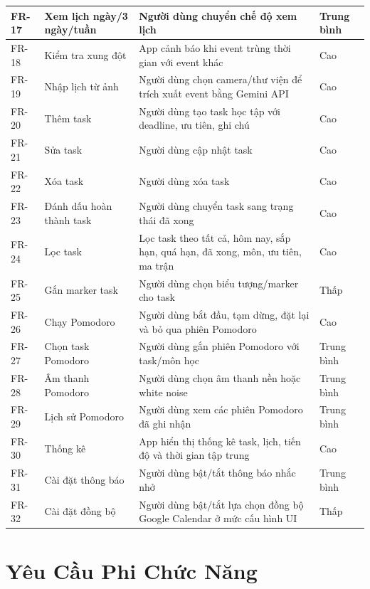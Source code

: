 \documentclass[12pt,a4paper]{report}
\begin{document}
\begin{longtable}{|>{\raggedright\arraybackslash}p{}|>{\raggedright\arraybackslash}p{}|>{\raggedright\arraybackslash}p{}|>{\raggedright\arraybackslash}p{}|}
FR-17 & Xem lịch ngày/3 ngày/tuần & Người dùng chuyển chế độ xem lịch & Trung bình \\ \hline
FR-18 & Kiểm tra xung đột & App cảnh báo khi event trùng thời gian với event khác & Cao \\ \hline
FR-19 & Nhập lịch từ ảnh & Người dùng chọn camera/thư viện để trích xuất event bằng Gemini API & Cao \\ \hline
FR-20 & Thêm task & Người dùng tạo task học tập với deadline, ưu tiên, ghi chú & Cao \\ \hline
FR-21 & Sửa task & Người dùng cập nhật task & Cao \\ \hline
FR-22 & Xóa task & Người dùng xóa task & Cao \\ \hline
FR-23 & Đánh dấu hoàn thành task & Người dùng chuyển task sang trạng thái đã xong & Cao \\ \hline
FR-24 & Lọc task & Lọc task theo tất cả, hôm nay, sắp hạn, quá hạn, đã xong, môn, ưu tiên, ma trận & Cao \\ \hline
FR-25 & Gắn marker task & Người dùng chọn biểu tượng/marker cho task & Thấp \\ \hline
FR-26 & Chạy Pomodoro & Người dùng bắt đầu, tạm dừng, đặt lại và bỏ qua phiên Pomodoro & Cao \\ \hline
FR-27 & Chọn task Pomodoro & Người dùng gắn phiên Pomodoro với task/môn học & Trung bình \\ \hline
FR-28 & Âm thanh Pomodoro & Người dùng chọn âm thanh nền hoặc white noise & Trung bình \\ \hline
FR-29 & Lịch sử Pomodoro & Người dùng xem các phiên Pomodoro đã ghi nhận & Trung bình \\ \hline
FR-30 & Thống kê & App hiển thị thống kê task, lịch, tiến độ và thời gian tập trung & Cao \\ \hline
FR-31 & Cài đặt thông báo & Người dùng bật/tắt thông báo nhắc nhở & Trung bình \\ \hline
FR-32 & Cài đặt đồng bộ & Người dùng bật/tắt lựa chọn đồng bộ Google Calendar ở mức cấu hình UI & Thấp \\ \hline
\end{longtable}

\section{Yêu Cầu Phi Chức Năng}
\end{document}
